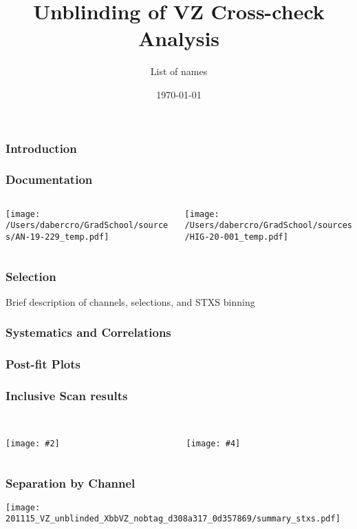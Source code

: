 \documentclass{beamer}
\author[D. Abercrombie]{
  List of names
}
\title{\bf \sffamily Unblinding of VZ Cross-check Analysis}
\date{\today}
\newcommand{\twofigs}[4]{
  \begin{columns}
    \begin{column}{0.5\linewidth}
      \centering
      \textcolor{blue}{#1} \\
      \texttt{[image: \#2]}
    \end{column}
    \begin{column}{0.5\linewidth}
      \centering
      \textcolor{blue}{#3} \\
      \texttt{[image: \#4]}
    \end{column}
  \end{columns}
}
\begin{document}
\begin{frame}
  \titlepage
\end{frame}

\begin{frame}
  \frametitle{Introduction}
\end{frame}

\begin{frame}
  \frametitle{Documentation}

  \begin{columns}
    \begin{column}{0.5\linewidth}
      \centering
      \texttt{[image: /Users/dabercro/GradSchool/sources/AN-19-229\_temp.pdf]}
    \end{column}
    \begin{column}{0.5\linewidth}
      \centering
      \texttt{[image: /Users/dabercro/GradSchool/sources/HIG-20-001\_temp.pdf]}
    \end{column}
  \end{columns}

\end{frame}

\begin{frame}
  \frametitle{Selection}

  Brief description of channels, selections, and STXS binning

\end{frame}

\begin{frame}
  \frametitle{Systematics and Correlations}

\end{frame}

\begin{frame}
  \frametitle{Post-fit Plots}

\end{frame}

\begin{frame}
  \frametitle{Inclusive Scan results}

  \twofigs{}
          {201115_inclVZ_unblinded_XbbVZ_d308a317_0d357869/scan_nominal_r.pdf}
          {}
          {201115_inclVZ_unblinded_XbbVZ_d308a317_0d357869/summary_stxs.pdf}

\end{frame}

\begin{frame}
  \frametitle{Separation by Channel}

  \centering
  \texttt{[image: 201115\_VZ\_unblinded\_XbbVZ\_nobtag\_d308a317\_0d357869/summary\_stxs.pdf]}

\end{frame}
\end{document}
